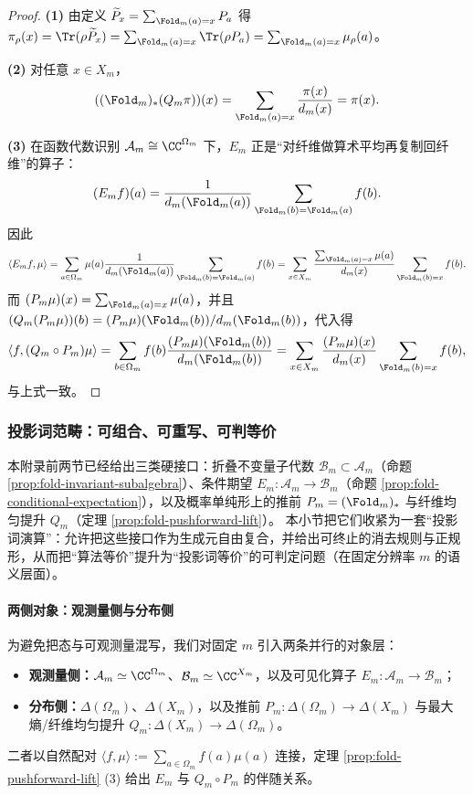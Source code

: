 \begin{proof}
\textbf{(1)} 由定义 \(\widetilde P_x=\sum_{\Fold_m(a)=x}P_a\) 得
\(
\pi_\rho(x)=\Tr(\rho\widetilde P_x)=\sum_{\Fold_m(a)=x}\Tr(\rho P_a)=\sum_{\Fold_m(a)=x}\mu_\rho(a)
\)。

\textbf{(2)} 对任意 $x\in X_m$，
\[
((\Fold_m)_*(Q_m\pi))(x)=\sum_{\Fold_m(a)=x}\frac{\pi(x)}{d_m(x)}=\pi(x).
\]

\textbf{(3)} 在函数代数识别 $\mathcal{A}_m\cong \CC^{\Omega_m}$ 下，$E_m$ 正是“对纤维做算术平均再复制回纤维”的算子：
\[
(E_m f)(a)=\frac{1}{d_m(\Fold_m(a))}\sum_{\Fold_m(b)=\Fold_m(a)} f(b).
\]
因此
\[
\langle E_m f,\mu\rangle
=\sum_{a\in\Omega_m}\mu(a)\frac{1}{d_m(\Fold_m(a))}\sum_{\Fold_m(b)=\Fold_m(a)} f(b)
=\sum_{x\in X_m}\frac{\sum_{\Fold_m(a)=x}\mu(a)}{d_m(x)}\sum_{\Fold_m(b)=x}f(b).
\]
而 $(P_m\mu)(x)=\sum_{\Fold_m(a)=x}\mu(a)$，并且 $(Q_m(P_m\mu))(b)=(P_m\mu)(\Fold_m(b))/d_m(\Fold_m(b))$，代入得
\[
\langle f,(Q_m\circ P_m)\mu\rangle
=\sum_{b\in\Omega_m} f(b)\frac{(P_m\mu)(\Fold_m(b))}{d_m(\Fold_m(b))}
=\sum_{x\in X_m}\frac{(P_m\mu)(x)}{d_m(x)}\sum_{\Fold_m(b)=x}f(b),
\]
与上式一致。
\end{proof}

\subsubsection{投影词范畴：可组合、可重写、可判等价}\label{app:op-algebra-projection-word}
本附录前两节已经给出三类硬接口：折叠不变量子代数 \(\mathcal{B}_m\subset\mathcal{A}_m\)（命题 \ref{prop:fold-invariant-subalgebra}）、条件期望 \(E_m:\mathcal{A}_m\to\mathcal{B}_m\)（命题 \ref{prop:fold-conditional-expectation}），以及概率单纯形上的推前 \(P_m=(\Fold_m)_*\) 与纤维均匀提升 \(Q_m\)（定理 \ref{prop:fold-pushforward-lift}）。
本小节把它们收紧为一套“投影词演算”：允许把这些接口作为生成元自由复合，并给出可终止的消去规则与正规形，从而把“算法等价”提升为“投影词等价”的可判定问题（在固定分辨率 \(m\) 的语义层面）。

\paragraph{两侧对象：观测量侧与分布侧}
为避免把态与可观测量混写，我们对固定 \(m\) 引入两条并行的对象层：
\begin{itemize}
  \item \textbf{观测量侧：}\(\mathcal{A}_m\simeq \CC^{\Omega_m}\)、\(\mathcal{B}_m\simeq \CC^{X_m}\)，以及可见化算子 \(E_m:\mathcal{A}_m\to\mathcal{B}_m\)；
  \item \textbf{分布侧：}\(\Delta(\Omega_m)\)、\(\Delta(X_m)\)，以及推前 \(P_m:\Delta(\Omega_m)\to\Delta(X_m)\) 与最大熵/纤维均匀提升 \(Q_m:\Delta(X_m)\to\Delta(\Omega_m)\)。
\end{itemize}
二者以自然配对
\(
\langle f,\mu\rangle:=\sum_{a\in\Omega_m} f(a)\mu(a)
\)
连接，定理 \ref{prop:fold-pushforward-lift} (3) 给出 \(E_m\) 与 \(Q_m\circ P_m\) 的伴随关系。

